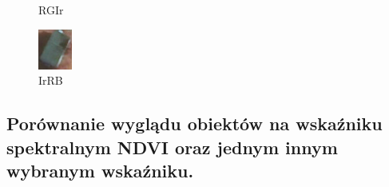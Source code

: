 \documentclass[a4paper,12pt]{article}  %
\begin{document}
\begin{figure}[H]
\begin{minipage}{0.24\textwidth}
        \caption*{RGIr}
    \end{minipage}
    \begin{minipage}{0.24\textwidth}
        \centering
        \includegraphics[width=\linewidth]{spektralne/irrb_budynek3.png}
        \caption*{IrRB}
    \end{minipage}
\end{figure}

\newpage
\subsection{Porównanie wyglądu obiektów na wskaźniku spektralnym NDVI oraz jednym innym wybranym wskaźniku.}
\end{document}
